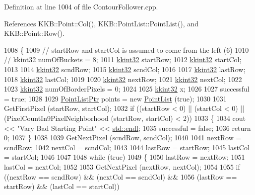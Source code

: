 Definition at line 1004 of file Contour\+Follower.\+cpp.



References K\+K\+B\+::\+Point\+::\+Col(), K\+K\+B\+::\+Point\+List\+::\+Point\+List(), and K\+K\+B\+::\+Point\+::\+Row().


\begin{DoxyCode}
1008 \{
1009   \textcolor{comment}{// startRow and startCol is assumed to come from the left (6)}
1010   \textcolor{comment}{// kkint32  numOfBuckets = 8;}
1011   \hyperlink{namespace_k_k_b_a8fa4952cc84fda1de4bec1fbdd8d5b1b}{kkint32}  startRow;
1012   \hyperlink{namespace_k_k_b_a8fa4952cc84fda1de4bec1fbdd8d5b1b}{kkint32}  startCol;
1013 
1014   \hyperlink{namespace_k_k_b_a8fa4952cc84fda1de4bec1fbdd8d5b1b}{kkint32}  scndRow;
1015   \hyperlink{namespace_k_k_b_a8fa4952cc84fda1de4bec1fbdd8d5b1b}{kkint32}  scndCol;
1016 
1017   \hyperlink{namespace_k_k_b_a8fa4952cc84fda1de4bec1fbdd8d5b1b}{kkint32}  lastRow;
1018   \hyperlink{namespace_k_k_b_a8fa4952cc84fda1de4bec1fbdd8d5b1b}{kkint32}  lastCol;
1019 
1020   \hyperlink{namespace_k_k_b_a8fa4952cc84fda1de4bec1fbdd8d5b1b}{kkint32}  nextRow;
1021   \hyperlink{namespace_k_k_b_a8fa4952cc84fda1de4bec1fbdd8d5b1b}{kkint32}  nextCol;
1022 
1023   \hyperlink{namespace_k_k_b_a8fa4952cc84fda1de4bec1fbdd8d5b1b}{kkint32}  numOfBorderPixels = 0;
1024 
1025   \hyperlink{namespace_k_k_b_a8fa4952cc84fda1de4bec1fbdd8d5b1b}{kkint32} x;
1026 
1027   successful = \textcolor{keyword}{true};
1028 
1029   \hyperlink{class_k_k_b_1_1_point_list}{PointListPtr}  points = \textcolor{keyword}{new} \hyperlink{class_k_k_b_1_1_point_list}{PointList} (\textcolor{keyword}{true});
1030 
1031   GetFirstPixel (startRow, startCol);
1032   \textcolor{keywordflow}{if}  ((startRow < 0)  ||  (startCol < 0)  ||  (PixelCountIn9PixelNeighborhood (startRow, startCol) < 2))
1033   \{
1034     cout << \textcolor{stringliteral}{"Vary Bad Starting Point"} << \hyperlink{namespace_k_k_b_ad1f50f65af6adc8fa9e6f62d007818a8}{std::endl};
1035     successful = \textcolor{keyword}{false};
1036     \textcolor{keywordflow}{return}  0;
1037   \}
1038    
1039   GetNextPixel (scndRow, scndCol);
1040 
1041   nextRow = scndRow;
1042   nextCol = scndCol;
1043 
1044   lastRow = startRow;
1045   lastCol = startCol;
1046 
1047 
1048   \textcolor{keywordflow}{while}  (\textcolor{keyword}{true})  
1049   \{
1050     lastRow = nextRow;
1051     lastCol = nextCol;
1052 
1053     GetNextPixel (nextRow, nextCol);
1054 
1055     \textcolor{keywordflow}{if}  ((nextRow == scndRow)   &&  (nextCol == scndCol)  &&
1056          (lastRow == startRow)  &&  (lastCol == startCol))

\end{DoxyCode}
